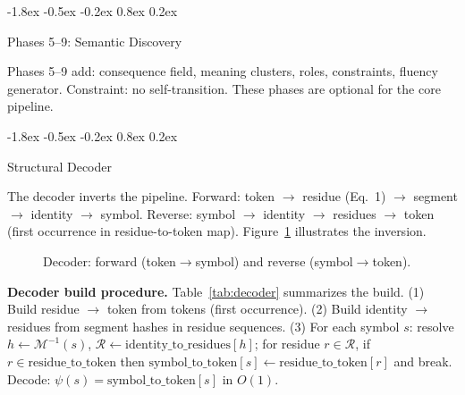 \documentclass[10pt]{article}
\makeatletter
\renewcommand{\subsection}{\@startsection{subsection}{2}{\z@}%
  {-1.8ex \@plus -0.5ex \@minus -0.2ex}%
  {0.8ex \@plus 0.2ex}%
  {\normalsize\bfseries\raggedright}}
\makeatother
\begin{document}
\subsection{Phases 5--9: Semantic Discovery}

Phases 5--9 add: consequence field, meaning clusters, roles, constraints, fluency generator. Constraint: no self-transition. These phases are optional for the core pipeline.

\subsection{Structural Decoder}

The decoder inverts the pipeline. Forward: token $\rightarrow$ residue (Eq.~1) $\rightarrow$ segment $\rightarrow$ identity $\rightarrow$ symbol. Reverse: symbol $\rightarrow$ identity $\rightarrow$ residues $\rightarrow$ token (first occurrence in residue-to-token map). Figure~\ref{fig:decoder} illustrates the inversion.

\begin{figure}[t]
\centering
{}
\caption{Decoder: forward (token$\rightarrow$symbol) and reverse (symbol$\rightarrow$token).}
\label{fig:decoder}
\end{figure}

\textbf{Decoder build procedure.}
Table~\ref{tab:decoder} summarizes the build. (1) Build residue $\rightarrow$ token from tokens (first occurrence). (2) Build identity $\rightarrow$ residues from segment hashes in residue sequences. (3) For each symbol $s$: resolve $h \gets \mathcal{M}^{-1}(s)$, $\mathcal{R} \gets \text{identity\_to\_residues}[h]$; for residue $r \in \mathcal{R}$, if $r \in \text{residue\_to\_token}$ then $\text{symbol\_to\_token}[s] \gets \text{residue\_to\_token}[r]$ and break. Decode: $\psi(s) = \text{symbol\_to\_token}[s]$ in $O(1)$.
\end{document}

